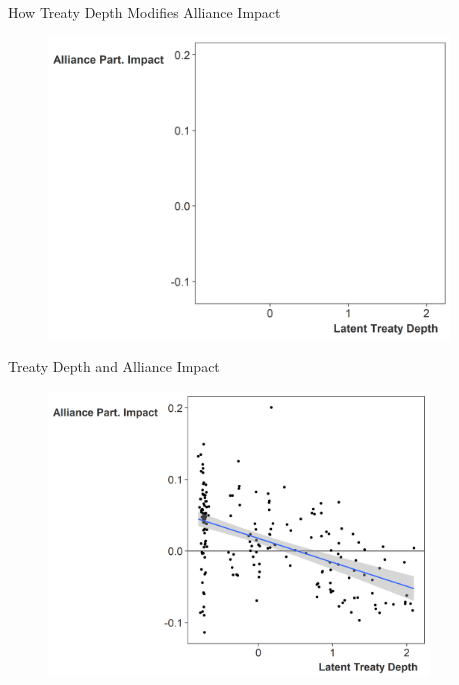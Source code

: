 \documentclass[12pt]{beamer}
\begin{document}


\begin{frame}{How Treaty Depth Modifies Alliance Impact}

\begin{figure}[htbp]
	\centering
		\includegraphics[width=0.95\textwidth]{ld-lambda-blank.png}
	\label{fig:ld-lambda-blank}
\end{figure}


\end{frame}



\begin{frame}{Treaty Depth and Alliance Impact}

\begin{figure}
	\centering
		\includegraphics[width=0.9\textwidth]{ld-lambda-min.png}
	\label{fig:ld-lambda-min}
\end{figure}


\end{frame}
\end{document}
